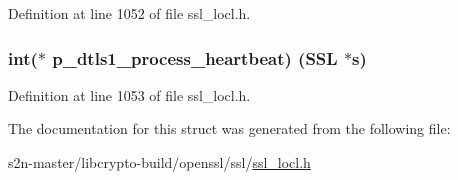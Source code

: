 Definition at line 1052 of file ssl\+\_\+locl.\+h.

\subsubsection[{\texorpdfstring{p\+\_\+dtls1\+\_\+process\+\_\+heartbeat}{p_dtls1_process_heartbeat}}]{\setlength{\rightskip}{0pt plus 5cm}int($\ast$ p\+\_\+dtls1\+\_\+process\+\_\+heartbeat) ({\bf S\+SL} $\ast$s)}\hypertarget{structopenssl__ssl__test__functions_a509a9bbb0f53f307a39ba565ea594252}{}\label{structopenssl__ssl__test__functions_a509a9bbb0f53f307a39ba565ea594252}


Definition at line 1053 of file ssl\+\_\+locl.\+h.



The documentation for this struct was generated from the following file\+:\begin{DoxyCompactItemize}
\item 
s2n-\/master/libcrypto-\/build/openssl/ssl/\hyperlink{ssl__locl_8h}{ssl\+\_\+locl.\+h}\end{DoxyCompactItemize}
